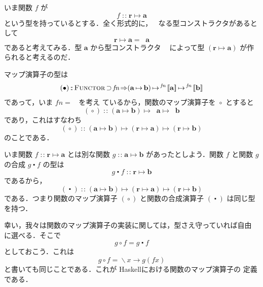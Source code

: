 \documentclass[a5paper,twoside,fleqn]{jsbook}
\def\[{\left[\!\left[}
\def\]{\right]\!\right]}
\newcommand{\programminglanguage}[1]{\textsf{#1}}
\newcommand{\haskell}{\programminglanguage{Haskell}}
\DeclareMathOperator{\mSuperClass}{\Rightarrow}
\DeclareMathOperator{\mSuperSet}{\supset}
\DeclareMathOperator{\mComp}{\centerdot}
\DeclareMathOperator{\mIn}{{:\!:}}
\DeclareMathOperator{\mLambda}{\backslash}
\DeclareMathOperator{\mLambdaArrow}{\rightarrow}
\DeclareMathOperator{\mMap}{\bullet}
\DeclareMathOperator{\mMapFunc}{\circ}
\DeclareMathOperator{\mMapsTo}{\mapsto}
\newcommand{\mType}[1]{\mathbf{#1}}
\newcommand{\mGenericTypeAssemble}[2]{{}^{\mTypeConstructor{#1}}\[\mType{#2}\]}
\newcommand{\mTypeConstructor}[1]{\textit{#1}}
\newcommand{\mFuncTypeConstructor}[1]{\mathop{\mTypeConstructor{Func}_\mType{#1}}}
\newcommand{\mGenericTypeClass}[1]{\textsc{#1}} %
\newcommand{\mFunctorTypeClass}{\mGenericTypeClass{Functor}}
\newcommand{\mLambdaExp}[2]{\mLambda{#1}\mLambdaArrow{#2}}
\newcommand{\mProj}[2]{#1\mMapsTo#2}
\begin{document}
いま関数 $f$ が
\begin{equation}
f\mIn\mProj{\mType{r}}{\mType{a}}
\end{equation}
という型を持っているとする．全く形式的に，$\mFuncTypeConstructor{r}$
なる型コンストラクタがあるとして
\begin{equation}
\mProj{\mType{r}}{\mType{a}}=\mFuncTypeConstructor{r}\mType{a}
\end{equation}
であると考えてみる．型 $\mType{a}$ から型コンストラクタ
$\mFuncTypeConstructor{r}$ によって型 $(\mProj{\mType{r}}{\mType{a}})$
が作られると考えるのだ．

マップ演算子の型は
\begin{equation}
(\mMap)\mIn{}\mFunctorTypeClass\mSuperSet\mTypeConstructor{fn}
  \mSuperClass\mProj{\mProj{(\mProj{\mType{a}}{\mType{b}})}
    {\mGenericTypeAssemble{fn}{a}}}{\mGenericTypeAssemble{fn}{b}}
\end{equation}
であって，いま $\mTypeConstructor{fn}=\mFuncTypeConstructor{r}$ を考え
ているから，関数のマップ演算子を $\mMapFunc$ とすると
\begin{equation}
  (\mMapFunc)\mIn{}\mProj{\mProj{(\mProj{\mType{a}}{\mType{b}})}
    {\mFuncTypeConstructor{r}\mType{a}}}{\mFuncTypeConstructor{r}\mType{b}}
\end{equation}
であり，これはすなわち
\begin{equation}
(\mMapFunc) \mIn{}\mProj{\mProj{(\mProj{\mType{a}}{\mType{b}})}
    {(\mProj{\mType{r}}{\mType{a}})}} {(\mProj{\mType{r}}{\mType{b}})}
\end{equation}
のことである．

いま関数 $f\mIn\mProj{\mType{r}}{\mType{a}}$ とは別な関数
$g\mIn\mProj{\mType{a}}{\mType{b}}$ があったとしよう．関数 $f$ と関数
$g$ の合成 $g\mComp f$ の型は
\begin{equation}
g\mComp f\mIn\mProj{\mType{r}}{\mType{b}}
\end{equation}
であるから，
\begin{equation}
  (\mComp)\mIn{}\mProj{\mProj{(\mProj{\mType{a}}{\mType{b}})}{(\mProj{\mType{r}}{\mType{a}})}}
  {(\mProj{\mType{r}}{\mType{b}})}
\end{equation}
である．つまり関数のマップ演算子 $(\mMapFunc)$ と関数の合成演算子
$(\mComp)$ は同じ型を持つ．

幸い，我々は関数のマップ演算子の実装に関しては，型さえ守っていれば自由
に選べる．そこで
\begin{equation}
g\mMapFunc f=g\mComp f
\end{equation}
としておこう．これは
\begin{equation}
g\mMapFunc f=\mLambdaExp{x}{g(fx)}
\end{equation}
と書いても同じことである．これが \haskell における関数のマップ演算子の
定義である．
\end{document}
